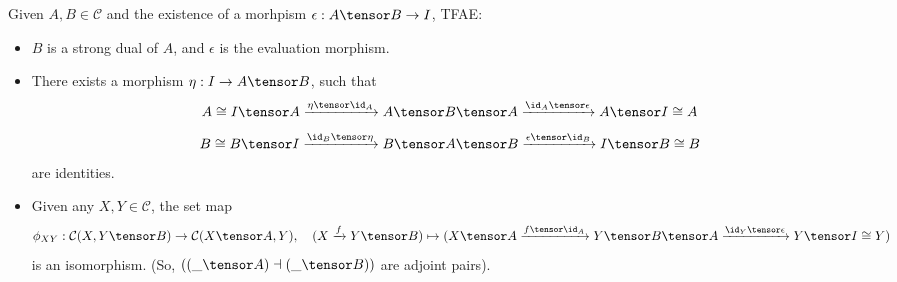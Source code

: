 \documentclass{article}
\begin{document}
\hfil

\begin{thm}
    Given $A,B\in\mathcal{C}$ and the existence of a morhpism $\epsilon:A\tensor B\rightarrow I$, TFAE:
    \begin{itemize}
        \item[(1)] $B$ is a strong dual of $A$, and $\epsilon$ is the evaluation morphism.
        \item[(2)] There exists a morphism $\eta:I\rightarrow A\tensor B$, such that 
        \[A\cong I\tensor A\xrightarrow{\eta\tensor \id_{A}}A\tensor B\tensor A\xrightarrow{\id_A\tensor \epsilon} A\tensor I\cong A\]
        \[B\cong B\tensor I\xrightarrow{\id_B\tensor \eta}B\tensor A\tensor B\xrightarrow{\epsilon\tensor \id_B}I\tensor B\cong B\]
        are identities.
        \item[(3)] Given any $X,Y\in\mathcal{C}$, the set map
        \[\phi_{XY}:\mathcal{C}(X,Y\tensor B)\rightarrow \mathcal{C}(X\tensor A,Y),\quad (X\xrightarrow{f}Y\tensor B)\mapsto (X\tensor A\xrightarrow{f\tensor \id_A}Y\tensor B\tensor A\xrightarrow{\id_Y\tensor \epsilon}Y\tensor I\cong Y)\]
        is an isomorphism. (So, $((\_\tensor A)\dashv (\_\tensor B))$ are adjoint pairs).
    \end{itemize}
\end{thm}
\end{document}
